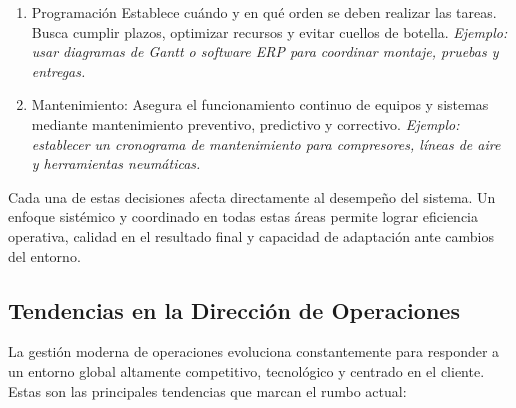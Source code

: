 \documentclass[a4paper,oneside,11pt]{article}
\begin{document}
\begin{enumerate}
    \item Programación Establece cuándo y en qué orden se deben realizar las tareas. Busca cumplir plazos, optimizar recursos y evitar cuellos de botella. \textit{Ejemplo: usar diagramas de Gantt o software ERP para coordinar montaje, pruebas y entregas.}
    \item Mantenimiento: Asegura el funcionamiento continuo de equipos y sistemas mediante mantenimiento preventivo, predictivo y correctivo. \textit{Ejemplo: establecer un cronograma de mantenimiento para compresores, líneas de aire y herramientas neumáticas.}
\end{enumerate}

Cada una de estas decisiones afecta directamente al desempeño del sistema. Un enfoque sistémico y coordinado en todas estas áreas permite lograr eficiencia operativa, calidad en el resultado final y capacidad de adaptación ante cambios del entorno.

\subsection{Tendencias en la Dirección de Operaciones}

La gestión moderna de operaciones evoluciona constantemente para responder a un entorno global altamente competitivo, tecnológico y centrado en el cliente. Estas son las principales tendencias que marcan el rumbo actual:
\end{document}
